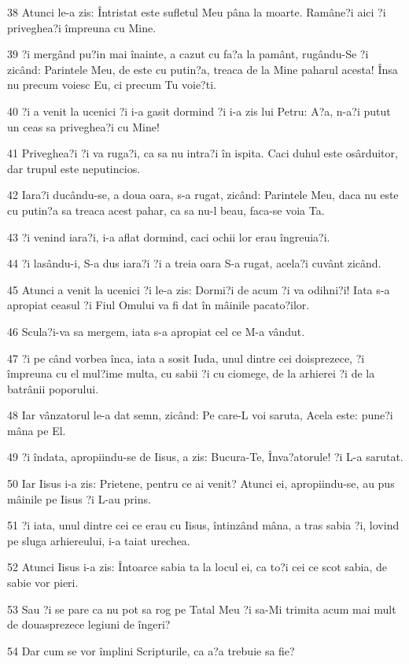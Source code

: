 \par 38 Atunci le-a zis: Întristat este sufletul Meu pâna la moarte. Ramâne?i aici ?i priveghea?i împreuna cu Mine.
\par 39 ?i mergând pu?in mai înainte, a cazut cu fa?a la pamânt, rugându-Se ?i zicând: Parintele Meu, de este cu putin?a, treaca de la Mine paharul acesta! Însa nu precum voiesc Eu, ci precum Tu voie?ti.
\par 40 ?i a venit la ucenici ?i i-a gasit dormind ?i i-a zis lui Petru: A?a, n-a?i putut un ceas sa priveghea?i cu Mine!
\par 41 Priveghea?i ?i va ruga?i, ca sa nu intra?i în ispita. Caci duhul este osârduitor, dar trupul este neputincios.
\par 42 Iara?i ducându-se, a doua oara, s-a rugat, zicând: Parintele Meu, daca nu este cu putin?a sa treaca acest pahar, ca sa nu-l beau, faca-se voia Ta.
\par 43 ?i venind iara?i, i-a aflat dormind, caci ochii lor erau îngreuia?i.
\par 44 ?i lasându-i, S-a dus iara?i ?i a treia oara S-a rugat, acela?i cuvânt zicând.
\par 45 Atunci a venit la ucenici ?i le-a zis: Dormi?i de acum ?i va odihni?i! Iata s-a apropiat ceasul ?i Fiul Omului va fi dat în mâinile pacato?ilor.
\par 46 Scula?i-va sa mergem, iata s-a apropiat cel ce M-a vândut.
\par 47 ?i pe când vorbea înca, iata a sosit Iuda, unul dintre cei doisprezece, ?i împreuna cu el mul?ime multa, cu sabii ?i cu ciomege, de la arhierei ?i de la batrânii poporului.
\par 48 Iar vânzatorul le-a dat semn, zicând: Pe care-L voi saruta, Acela este: pune?i mâna pe El.
\par 49 ?i îndata, apropiindu-se de Iisus, a zis: Bucura-Te, Înva?atorule! ?i L-a sarutat.
\par 50 Iar Iisus i-a zis: Prietene, pentru ce ai venit? Atunci ei, apropiindu-se, au pus mâinile pe Iisus ?i L-au prins.
\par 51 ?i iata, unul dintre cei ce erau cu Iisus, întinzând mâna, a tras sabia ?i, lovind pe sluga arhiereului, i-a taiat urechea.
\par 52 Atunci Iisus i-a zis: Întoarce sabia ta la locul ei, ca to?i cei ce scot sabia, de sabie vor pieri.
\par 53 Sau ?i se pare ca nu pot sa rog pe Tatal Meu ?i sa-Mi trimita acum mai mult de douasprezece legiuni de îngeri?
\par 54 Dar cum se vor împlini Scripturile, ca a?a trebuie sa fie?
